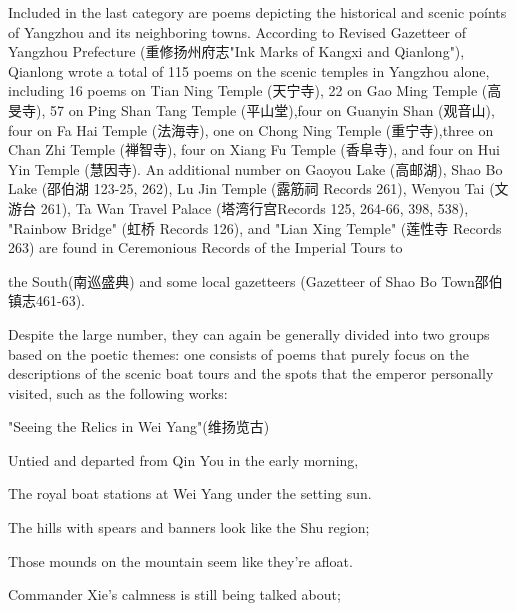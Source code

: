 Included in the last category are poems depicting the historical and scenic poínts of Yangzhou and its neighboring towns. According to Revised Gazetteer of Yangzhou Prefecture (重修扬州府志"Ink Marks of Kangxi and Qianlong"), Qianlong wrote a total of 115 poems on the scenic temples in Yangzhou alone, including 16 poems on Tian Ning Temple (天宁寺), 22 on Gao Ming Temple (高旻寺), 57 on Ping Shan Tang Temple (平山堂),four on Guanyin Shan (观音山), four on Fa Hai Temple (法海寺), one on Chong Ning Temple (重宁寺),three on Chan Zhi Temple (禅智寺), four on Xiang Fu Temple (香阜寺), and four on Hui Yin Temple (慧因寺). An additional number on Gaoyou Lake (高邮湖), Shao Bo Lake (邵伯湖 123-25, 262), Lu Jin Temple (露筋祠 Records 261), Wenyou Tai (文游台 261), Ta Wan Travel Palace (塔湾行宫Records 125, 264-66, 398, 538), "Rainbow Bridge" (虹桥 Records 126), and "Lian Xing Temple" (莲性寺 Records 263) are found in Ceremonious Records of the Imperial Tours to


\noindent the South(南巡盛典) and some local gazetteers (Gazetteer of Shao Bo Town邵伯镇志461-63).

Despite the large number, they can again be generally divided into two groups based on the poetic themes: one consists of poems that purely focus on the descriptions of the scenic boat tours and the spots that the emperor personally visited, such as the following works:

"Seeing the Relics in Wei Yang"(维扬览古)

\begin{BookQuote}
Untied and departed from Qin You in the early morning,
\end{BookQuote}

\begin{BookQuote}
The royal boat stations at Wei Yang under the setting sun.
\end{BookQuote}

\begin{BookQuote}
The hills with spears and banners look like the Shu region;
\end{BookQuote}

\begin{BookQuote}
Those mounds on the mountain seem like they're afloat.
\end{BookQuote}

\begin{BookQuote}
Commander Xie's calmness is still being talked about;
\end{BookQuote}

